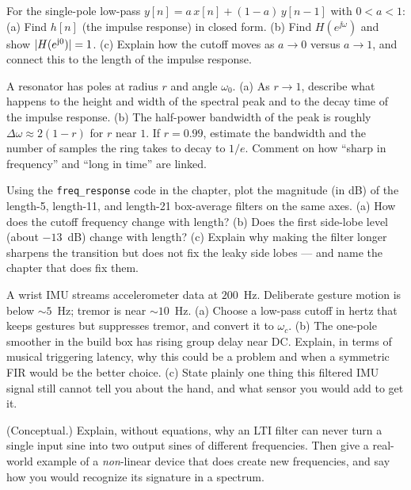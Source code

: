 \begin{exercise}
For the single-pole low-pass $y[n]=a\,x[n]+(1-a)\,y[n-1]$ with $0<a<1$:
(a) Find $h[n]$ (the impulse response) in closed form.
(b) Find $H(e^{\jj\omega})$ and show $\lvert H(e^{\mathrm{j}0})\rvert=1$.
(c) Explain how the cutoff moves as $a\to 0$ versus $a\to 1$, and connect this
to the length of the impulse response.
\end{exercise}

\begin{exercise}
A resonator has poles at radius $r$ and angle $\omega_0$. (a) As $r\to 1$,
describe what happens to the height and width of the spectral peak and to the
decay time of the impulse response. (b) The half-power bandwidth of the peak is
roughly $\Delta\omega \approx 2(1-r)$ for $r$ near $1$. If $r=0.99$, estimate the
bandwidth and the number of samples the ring takes to decay to $1/e$. Comment on
how ``sharp in frequency'' and ``long in time'' are linked.
\end{exercise}

\begin{exercise}
Using the \texttt{freq\_response} code in the chapter, plot the magnitude (in dB)
of the length-5, length-11, and length-21 box-average filters on the same axes.
(a) How does the cutoff frequency change with length? (b) Does the first
side-lobe level (about $-13$~dB) change with length? (c) Explain why making the
filter longer sharpens the transition but does not fix the leaky side lobes ---
and name the chapter that does fix them.
\end{exercise}

\begin{exercise}
A wrist IMU streams accelerometer data at $200$~Hz. Deliberate gesture motion is
below $\sim 5$~Hz; tremor is near $\sim 10$~Hz. (a) Choose a low-pass cutoff in
hertz that keeps gestures but suppresses tremor, and convert it to $\omega_c$.
(b) The one-pole smoother in the build box has rising group delay near DC.
Explain, in terms of musical triggering latency, why this could be a problem and
when a symmetric FIR would be the better choice. (c) State plainly one thing this
filtered IMU signal still cannot tell you about the hand, and what sensor you
would add to get it.
\end{exercise}

\begin{exercise}
(Conceptual.) Explain, without equations, why an LTI filter can never turn a
single input sine into two output sines of different frequencies. Then give a
real-world example of a \emph{non}-linear device that does create new frequencies,
and say how you would recognize its signature in a spectrum.
\end{exercise}
